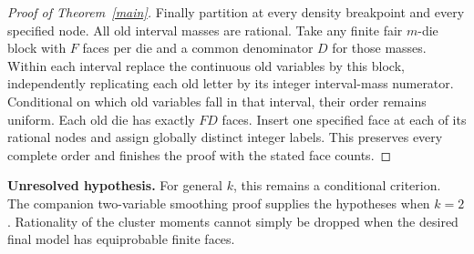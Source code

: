 \documentclass[11pt]{article}
\begin{document}
\begin{proof}[Proof of Theorem~\ref{main}]
Finally partition at every density breakpoint and every specified
node. All old interval masses are rational. Take any finite fair
$m$-die block with $F$ faces per die and a common denominator $D$
for those masses. Within each interval replace the continuous old
variables by this block, independently replicating each old letter
by its integer interval-mass numerator. Conditional on which old
variables fall in that interval, their order remains uniform.
Each old die has exactly $FD$ faces. Insert one specified face at
each of its rational nodes and assign globally distinct integer
labels. This preserves every complete order and finishes the proof
with the stated face counts.
\end{proof}

\noindent\textbf{Unresolved hypothesis.} For general $k$, this remains a conditional criterion. The companion
two-variable smoothing proof supplies the hypotheses when $k=2$.
Rationality of the cluster moments cannot simply be dropped when the
desired final model has equiprobable finite faces.
\end{document}
